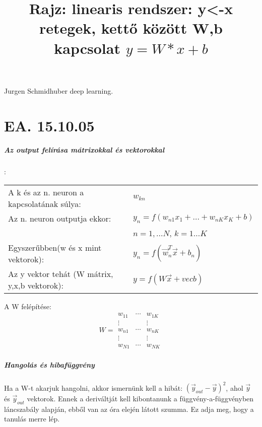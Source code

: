 \documentclass[10pt,a4paper]{report}
\begin{document}
\paragraph{}
Jurgen Schmidhuber deep learning.

\chapter{EA. 15.10.05}
\paragraph{Az output felírása mátrixokkal és vektorokkal}:\\
\begin{tabular}{ll}
A k és az n. neuron a kapcsolatának súlya: &$ w_{kn} $\\
Az n. neuron outputja ekkor: &$y_n=f(w_{n1}x_1+\dots + w_{nK}x_K+b)$ \\ &$n=1,\dots N$, $k=1\dots K$\\
Egyszerűbben(w és x mint vektorok): &$y_n = f(\vec{w}_n^T\vec{x}+b_n)$\\
Az y vektor tehát (W mátrix, y,x,b vektorok): &$y = f(W\vec{x} + vec{b}) $\\
\end{tabular}

A W felépítése: 
\begin{equation}
W = \begin{matrix}
w_{11}&\cdots &w_{1K}\\
\vdots & &\vdots \\ 
w_{n1} &\cdots& w_{nK} \\
\vdots & &\vdots \\ 
w_{N1} &\cdots &w_{NK}
\end{matrix}
\end{equation}
\paragraph{Hangolás és hibafüggvény}
Ha a W-t akarjuk hangolni, akkor ismernünk kell a hibát: $(\vec{y}_{out} - \vec{y})^2$, ahol $\vec{y}$ és $\vec{y}_{out}$ vektorok. Ennek a deriváltját kell kibontanunk a függvény-a-függvényben láncszabály alapján, ebből van az óra elején látott szumma. Ez adja meg, hogy a tanulás merre lép. 
\begin{figure}[h]
\title{Rajz: linearis rendszer: y<-x retegek, kettő között W,b kapcsolat $y=W*x+b$}
\end{figure}
\end{document}
